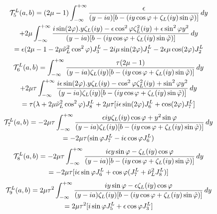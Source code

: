 \begin{multline}
\mathcal{T}_5^L(a,b)= (2\mu-1) \int_{-\infty}^{+\infty}\frac{\epsilon}{(y-ia)\lbrack b- (iy\cos \varphi+\zeta_L(iy)\sin\phiti) \rbrack} \, dy \\
+2\mu\int_{-\infty}^{+\infty} \frac{ i\sin(2\varphi).y\zeta_L(iy)-\epsilon \cos^2\varphi \zeta_L^2(iy)+\epsilon \sin^2\varphi y^2}{(y-ia)\lbrack b- (iy\cos \varphi+\zeta_L(iy)\sin\phiti) \rbrack} \, dy \\
\hfill=\epsilon(2\mu-1-2\mu\nuti_L^2\cos^2\varphi)J_3^L-2i\mu\sin(2\varphi)J_1^L-2\epsilon\mu\cos(2\varphi)J_2^L\hfill
\end{multline}
\begin{multline}
\mathcal{T}_6^L(a,b)=   \int_{-\infty}^{+\infty}\frac{\tau(2\mu-1)}{(y-ia)\zeta_L(iy)\lbrack b- (iy\cos \varphi+\zeta_L(iy)\sin\phiti) \rbrack} \, dy \\
+2\mu\tau\int_{-\infty}^{+\infty} \frac{ i\epsilon\sin(2\varphi).y\zeta_L(iy)- \cos^2\varphi \zeta_L^2(iy)+ \sin^2\varphi y^2}{(y-ia)\zeta_L(iy)\lbrack b- (iy\cos \varphi+\zeta_L(iy)\sin\phiti) \rbrack} \, dy \\
\hfill =\tau(\lambda+2\mu\nuti_L^2\cos^2\varphi)J_8^L+2\mu\tau\lbrack i\epsilon \sin(2\varphi)J_6^L+\cos(2\varphi)J_7^L \rbrack \hfill
\end{multline}
\begin{multline}
\mathcal{T}_7^L(a,b)=-2\mu \tau \int_{-\infty}^{+\infty} \frac{ \epsilon iy\zeta_L(iy)\cos\varphi+y^2\sin\varphi}{(y-ia)\zeta_L(iy)\lbrack b- (iy\cos \varphi+\zeta_L(iy)\sin\phiti) \rbrack} \, dy \\
\hfill =-2\mu\tau(\sin\varphi J_7^L-i\epsilon\cos\varphi J_6^L) \hfill
\end{multline}
\begin{multline}
\mathcal{T}_8^L(a,b)=-2\mu \tau \int_{-\infty}^{+\infty} \frac{i\epsilon y \sin\varphi-\zeta_L(iy)\cos\varphi}{(y-ia)\lbrack b- (iy\cos \varphi+\zeta_L(iy)\sin\phiti) \rbrack} \, dy\\
\hfill=-2\mu\tau\lbrack i\epsilon\sin\varphi J_6^L+\cos\varphi(J_7^L+\nuti_L^2J_8^L) \rbrack\hfill
\end{multline}
\begin{multline}
\mathcal{T}_9^L(a,b)=2\mu \tau^2 \int_{-\infty}^{+\infty} \frac{i y\sin\varphi- \epsilon\zeta_L(iy)\cos\varphi}{(y-ia)\zeta_L(iy)\lbrack b- (iy\cos \varphi+\zeta_L(iy)\sin\phiti) \rbrack} \, dy \\
\hfill=2\mu\tau^2\lbrack i\sin\varphi J_5^L+\epsilon\cos\varphi J_3^L \rbrack \hfill
\end{multline}

